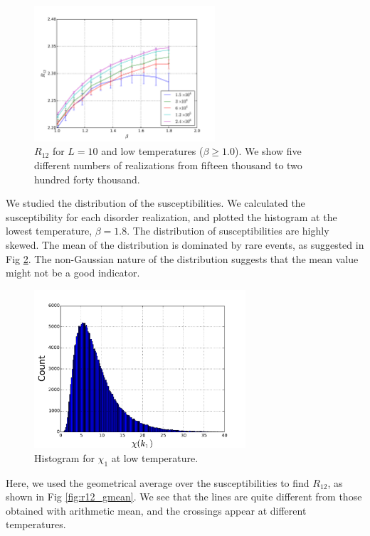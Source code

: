 \begin{figure}[ht]
\centering
  \includegraphics[width=0.6\textwidth]{img/R12_l10_samples.pdf}
  \caption{$R_{12}$ for $L=10$ and low temperatures ($\beta \geq 1.0$). We show five different numbers of 
realizations from fifteen thousand to two hundred forty thousand.}
\label{fig:R12_l10_samples}
\end{figure}


We studied the distribution of the susceptibilities. We calculated the susceptibility
for each disorder realization, and plotted the histogram at the lowest temperature,
$\beta=1.8$.
The distribution of susceptibilities are highly skewed. 
The mean of the distribution is dominated by rare
events, as suggested in Fig \ref{fig:hist_chi}. 
The non-Gaussian nature of the distribution suggests that the mean value might 
not be a good indicator. 


\begin{figure}[ht]
  \centering
  \includegraphics[width=0.7\textwidth]{img/chi_1_dist.pdf}
  \caption{Histogram for $\chi_1$ at low temperature.}
\label{fig:hist_chi}
\end{figure}

Here, we used the geometrical average \cite{PhysRevB.88.134204} over the susceptibilities to find $R_{12}$,
as shown in Fig \ref{fig:r12_gmean}.
We see that the lines are quite different from those obtained with arithmetic 
mean, and the crossings appear at different temperatures. 



